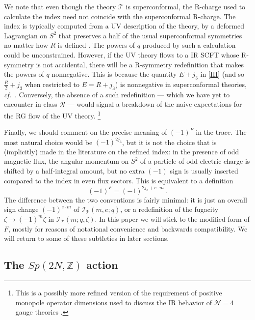 \documentclass[11pt,letterpaper]{article}
\numberwithin{equation}{section}
\newcommand{\cf}{\emph{cf.}}
\newcommand{\Z}{{\mathbb Z}}
\newcommand{\CI}{\mathcal{I}}
\newcommand{\CN}{\mathcal{N}}
\newcommand{\CR}{\mathcal{R}}
\newcommand{\CT}{\mathcal{T}}
\newcommand{\q}{q}
\begin{document}
We note that even though the theory $\CT$ is superconformal, the R-charge used to calculate the index need not coincide with the superconformal R-charge. The index is typically computed from a UV description of the theory, by a deformed Lagrangian on $S^2$
that preserves a half of the usual superconformal symmetries no matter how $R$ is defined \cite{IY-index, FestucciaSeiberg}.
The powers of $q$ produced by such a calculation could be unconstrained.
However, if the UV theory flows to a IR SCFT whose R-symmetry is not accidental, there will be a R-symmetry redefinition that makes the powers of $q$ nonnegative. This is because the quantity $E+j_3$ in \eqref{IH} (and so $\tfrac R2+j_3$ when restricted to $E=R+j_3$) is nonnegative in superconformal theories, \cf\ \cite{Minwalla-restrictions}.
Conversely, the absence of a such redefinition --- which we have yet to encounter in class $\CR$ --- would signal a breakdown of the naive expectations for the RG flow of the UV theory.%
%
\footnote{This is a possibly more refined version of
the requirement of positive monopole operator dimensions used to discuss the IR behavior of $\CN=4$ gauge theories \cite{GW-Sduality}.}




 Finally, we should comment on the precise meaning of $(-1)^F$ in the trace. The most natural choice would be $(-1)^{2 j_3}$, but it is not the choice that is (implicitly) made in the
literature on the refined index: in the presence of odd magnetic flux, the angular momentum on $S^2$ of a particle of odd electric charge is shifted by a half-integral amount, but
no extra $(-1)$ sign is usually inserted compared to the index in even flux sectors. This is equivalent to a definition
\begin{equation}
(-1)^F = (-1)^{2 j_3 + e\cdot m}\,.
\end{equation}
The difference between the two conventions is fairly minimal: it is just an overall sign change $(-1)^{e\cdot m}$ of $\CI_\CT(m,e;\q)$, or a redefinition of the fugacity $\zeta \to (-1)^m \zeta$ in $\CI_\CT( m;q,\zeta)$.
In this paper we will stick to the modified form of $F$, mostly for reasons of notational convenience and backwards compatibility. We will return to some of these subtleties in later sections.



\subsection{The $Sp(2N,\Z)$ action}
\label{sec:Sp}
\end{document}
